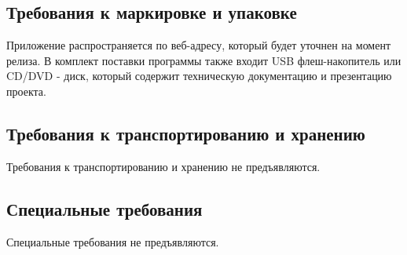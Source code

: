 \subsection{Требования к маркировке и упаковке}
Приложение распространяется по веб-адресу, который будет уточнен на момент релиза.
В комплект поставки программы также входит USB флеш-накопитель или CD/DVD - диск,
который содержит техническую документацию и презентацию проекта. 

\subsection{Требования к транспортированию и хранению}
Требования к транспортированию и хранению не предъявляются.

\subsection{Специальные требования}
Специальные требования не предъявляются.


